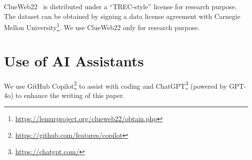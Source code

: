 ClueWeb22~\citep{clueweb22} is distributed under a ``TREC-style'' license for research purpose.  
The dataset can be obtained by signing a data license agreement with Carnegie Mellon University\footnote{\url{https://lemurproject.org/clueweb22/obtain.php}}.
We use ClueWeb22 only for research purpose.

\section{Use of AI Assistants}

We use GitHub Copilot\footnote{\url{https://github.com/features/copilot}} to assist with coding and ChatGPT\footnote{\url{https://chatgpt.com/}} (powered by GPT-4o) to enhance the writing of this paper.
